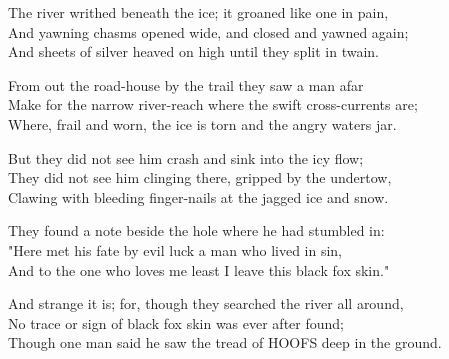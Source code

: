 \begin{poemblock}
The river writhed beneath the ice; it groaned like one in pain,\\
And yawning chasms opened wide, and closed and yawned again;\\
And sheets of silver heaved on high until they split in twain.

From out the road-house by the trail they saw a man afar\\
Make for the narrow river-reach where the swift cross-currents are;\\
Where, frail and worn, the ice is torn and the angry waters jar.

But they did not see him crash and sink into the icy flow;\\
They did not see him clinging there, gripped by the undertow,\\
Clawing with bleeding finger-nails at the jagged ice and snow.

They found a note beside the hole where he had stumbled in:\\
"Here met his fate by evil luck a man who lived in sin,\\
And to the one who loves me least I leave this black fox skin."

And strange it is; for, though they searched the river all around,\\
No trace or sign of black fox skin was ever after found;\\
Though one man said he saw the tread of HOOFS deep in the ground.
\end{poemblock}
